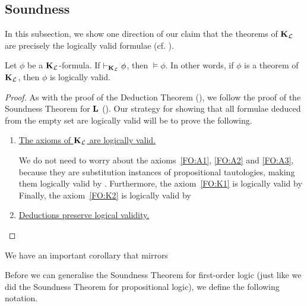 \subsection{Soundness}

In this subsection, we show one direction of our claim that the theorems of $\mathbf{K}_{\mathcal{L}}$ are precisely the logically valid formulae (cf. ).

\begin{boxtheorem}\label{Ch2:Thm:KLSoundness}
    Let $\phi$ be a $\mathbf{K}_{\mathcal{L}}$-formula. If $\vdash_{\mathbf{K}_{\mathcal{L}}} \phi$, then $\models \phi$. In other words, if $\phi$ is a theorem of $\mathbf{K}_{\mathcal{L}}$, then $\phi$ is logically valid.
\end{boxtheorem}
\begin{proof}
    As with the proof of the Deduction Theorem (), we follow the proof of the Soundness Theorem for $\mathbf{L}$ (). Our strategy for showing that all formulae deduced from the empty set are logically valid will be to prove the following.
    \begin{enumerate}
        \item \underline{The axioms of $\mathbf{K}_{\mathcal{L}}$ are logically valid.}

        We do not need to worry about the axioms~\ref{FO:A1}, \ref{FO:A2} and \ref{FO:A3}, because they are substitution instances of propositional tautologies, making them logically valid by . Furthermore, the axiom~\ref{FO:K1} is logically valid by \sorry %
        Finally, the axiom~\ref{FO:K2} is logically valid by \sorry %

        \item \underline{Deductions preserve logical validity.}

        \sorry %
    \end{enumerate}
\end{proof}

We have an important corollary that mirrors \sorry %

Before we can generalise the Soundness Theorem for first-order logic (just like we did the Soundness Theorem for propositional logic), we define the following notation.

